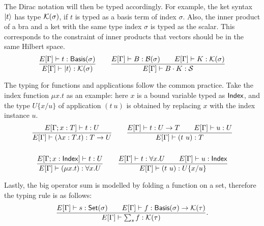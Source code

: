 \documentclass[runningheads]{llncs}
\begin{document}
The Dirac notation will then be typed accordingly. For example, the ket syntax $\ket{t}$ has type $\mathcal{K}(\sigma)$, if $t$ is typed as a basis term of index $\sigma$. Also, the inner product of a bra and a ket with the same type index $\sigma$ is typed as the scalar. This corresponds to the constraint of inner products that vectors should be in the same Hilbert space.
\begin{gather*}
    \frac{E[\Gamma]\vdash t : \mathsf{Basis}(\sigma)}{E[\Gamma] \vdash \ket{t} : \mathcal{K}(\sigma)}
    \qquad
    \frac{E[\Gamma]\vdash B : \mathcal{B}(\sigma) \qquad E[\Gamma]\vdash K : \mathcal{K}(\sigma)}{E[\Gamma] \vdash B \cdot K : \mathcal{S}}
\end{gather*}

The typing for functions and applications follow the common practice. 
Take the index function $\mu x. t$ as an example: here $x$ is a bound variable typed as $\mathsf{Index}$, and the type $U\{x/u\}$ of application $(t\ u)$ is obtained by replacing $x$ with the index instance $u$.
\begin{gather*}
    \frac{E[\Gamma; x : T] \vdash t : U}{E[\Gamma] \vdash (\lambda x : T . t) : T \to U}
    \qquad
    \frac{E[\Gamma] \vdash t:U \to T \qquad E[\Gamma] \vdash u:U}{E[\Gamma] \vdash (t\ u):T} \\
    \\
    \frac{E[\Gamma; x : \mathsf{Index}] \vdash t : U}{E[\Gamma] \vdash (\mu x.t) : \forall x.U}
    \qquad
    \frac{E[\Gamma] \vdash t:\forall x.U \qquad E[\Gamma] \vdash u : \mathsf{Index}}{E[\Gamma] \vdash (t\ u):U\{x/u\}}
\end{gather*}


Lastly, the big operator sum is modelled by folding a function on a set, therefore the typing rule is as follows:
\[
    \frac{E[\Gamma] \vdash s : \mathsf{Set}(\sigma) \qquad E[\Gamma] \vdash f : \mathsf{Basis}(\sigma) \to \mathcal{K}(\tau)}{E[\Gamma] \vdash \sum_{s} f : \mathcal{K}(\tau)}.
\]

\end{document}
